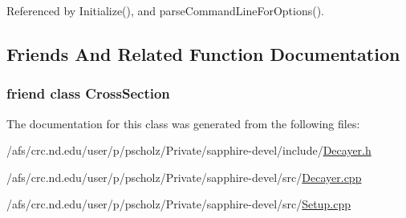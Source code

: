 Referenced by Initialize(), and parse\-Command\-Line\-For\-Options().



\subsection{Friends And Related Function Documentation}
\hypertarget{classDecayer_a4fae3d4b03faff9827a46178c567885b}{
\subsubsection[{Cross\-Section}]{\setlength{\rightskip}{0pt plus 5cm}friend class {\bf Cross\-Section}\hspace{0.3cm}{\ttfamily [friend]}}}\label{classDecayer_a4fae3d4b03faff9827a46178c567885b}


The documentation for this class was generated from the following files\-:\begin{DoxyCompactItemize}
\item 
/afs/crc.\-nd.\-edu/user/p/pscholz/\-Private/sapphire-\/devel/include/\hyperlink{Decayer_8h}{Decayer.\-h}\item 
/afs/crc.\-nd.\-edu/user/p/pscholz/\-Private/sapphire-\/devel/src/\hyperlink{Decayer_8cpp}{Decayer.\-cpp}\item 
/afs/crc.\-nd.\-edu/user/p/pscholz/\-Private/sapphire-\/devel/src/\hyperlink{Setup_8cpp}{Setup.\-cpp}\end{DoxyCompactItemize}
